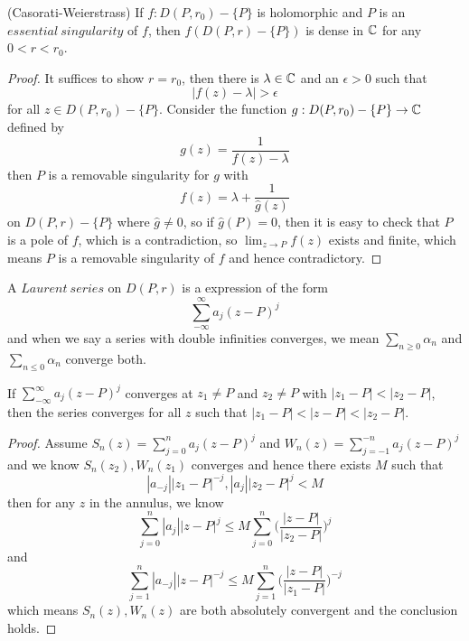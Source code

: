 \begin{theorem}
    (Casorati-Weierstrass) If  $f:D(P,r_0)-\{P\}$ is holomorphic and $P$ is an $essential\ singularity$ of $f$, then $f(D(P,r)-\{P\})$ is dense in $\mathbb{C}$ for any $0<r<r_0$.
\end{theorem}
\begin{proof}\par
    It suffices to show $r=r_0$, then there is $\lambda \in \mathbb{C}$ and an $\epsilon > 0$ such that
    \[|f(z)-\lambda|>\epsilon\]
    for all $z\in D(P,r_0)-\{P\}$. Consider the function $g:D(P,r_0)-\{P\}\to \mathbb{C}$ defined by
    \[
    g(z) = \dfrac{1}{f(z)-\lambda}
    \]
    then $P$ is a removable singularity for $g$ with
    \[
    f(z) = \lambda + \dfrac{1}{\hat{g}(z)}
    \]
    on $D(P,r)-\{P\}$ where $\hat{g} \neq 0$, so if $\hat{g}(P) = 0$, then it is easy to check that $P$ is a pole of $f$, which is a contradiction, so $\lim_{z\to P}f(z)$ exists and finite, which means $P$ is a removable singularity of $f$ and hence contradictory.
\end{proof}

\begin{definition}
    A $Laurent\ series$ on $D(P,r)$ is a expression of the form
    \[
    \sum\limits_{-\infty}^{\infty}a_j (z-P)^j
    \]
    and when we say a series with double infinities converges, we mean $\sum_{n\geq 0}\alpha_n$ and $\sum_{n\leq 0}\alpha_n$ converge both.
\end{definition}

\begin{lemma}
    If $\sum\limits_{-\infty}^{\infty} a_j(z-P)^j$ converges at $z_1 \neq P$ and $z_2\neq P$ with $|z_1 - P| < |z_2 - P|$, then the series converges for all $z$ such that $|z_1 - P| < |z-P|<|z_2-P|$.
\end{lemma}
\begin{proof}\par
    Assume $S_n(z) = \sum\limits_{j=0}^n a_j(z-P)^j$ and $W_n(z) = \sum\limits_{j=-1}^{-n} a_j(z-P)^j$ and we know $S_n(z_2),W_n(z_1)$ converges and hence there exists $M$ such that
    \[
    |a_{-j}||z_1-P|^{-j}, |a_j||z_2-P|^{j} < M
    \]
    then for any $z$ in the annulus, we know
    \[
    \sum\limits_{j=0}^n |a_j||z-P|^j \leq M\sum\limits_{j=0}^n \Big(\dfrac{|z-P|}{|z_2-P|}\Big)^j
    \]
    and
    \[
    \sum\limits_{j=1}^{n} |a_{-j}||z-P|^{-j} \leq M\sum\limits_{j=1}^{n} \Big(\dfrac{|z-P|}{|z_1-P|}\Big)^{-j}
    \]
    which means $S_n(z),W_n(z)$ are both absolutely convergent and the conclusion holds.
\end{proof}

